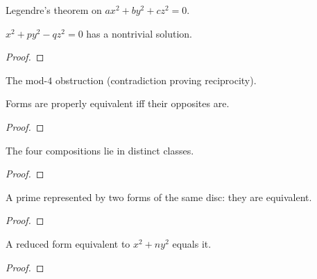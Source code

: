 \begin{theorem}[Exercise 2.24]
  \label{exr:s2_24}
  \leanok
  Legendre's theorem on $ax^2+by^2+cz^2=0$.
\end{theorem}

\begin{theorem}[Exercise 2.24(a)]
  \label{exr:s2_24_a}
  \leanok
  $x^2+py^2-qz^2=0$ has a nontrivial solution.
\end{theorem}
\begin{proof}\end{proof}

\begin{theorem}[Exercise 2.24(b)]
  \label{exr:s2_24_b}
  \leanok
  The mod-$4$ obstruction (contradiction proving reciprocity).
\end{theorem}

\begin{theorem}[Exercise 2.25]
  \label{exr:s2_25}
  \leanok
  Forms are properly equivalent iff their opposites are.
\end{theorem}
\begin{proof}\end{proof}

\begin{theorem}[Exercise 2.26]
  \label{exr:s2_26}
  \leanok
  The four compositions lie in distinct classes.
\end{theorem}
\begin{proof}\end{proof}

\begin{theorem}[Exercise 2.27(a)]
  \label{exr:s2_27_a}
  \leanok
  A prime represented by two forms of the same disc: they are equivalent.
\end{theorem}
\begin{proof}\end{proof}

\begin{theorem}[Exercise 2.27(b)]
  \label{exr:s2_27_b}
  \leanok
  A reduced form equivalent to $x^2+ny^2$ equals it.
\end{theorem}
\begin{proof}\end{proof}

